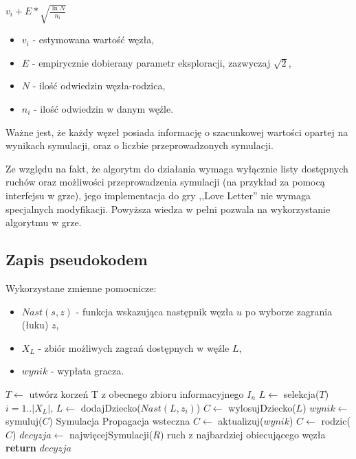 \begin{center}
	${v_i} + E*\sqrt{\frac{\ln{N}}{n_i}}$
\end{center}
\begin{itemize}
	\item $v_i$ - estymowana wartość węzła,
	\item $E$ - empirycznie dobierany parametr eksploracji, zazwyczaj $\sqrt{2}$,
	\item $N$ - ilość odwiedzin węzła-rodzica,
	\item $n_i$ - ilość odwiedzin w danym węźle.
\end{itemize}
Ważne jest, że każdy węzeł posiada informację o szacunkowej wartości opartej na wynikach symulacji, oraz o liczbie przeprowadzonych symulacji.

Ze względu na fakt, że algorytm do działania wymaga wyłącznie listy dostępnych ruchów oraz możliwości przeprowadzenia symulacji (na przykład za pomocą interfejsu w grze), jego implementacja do gry ,,Love Letter'' nie wymaga specjalnych modyfikacji. Powyższa wiedza w pełni pozwala na wykorzystanie algorytmu w grze.
\subsection{Zapis pseudokodem}
Wykorzystane zmienne pomocnicze:
\begin{itemize}
	\item $Nast(s, z)$ - funkcja wskazująca następnik węzła $u$ po wyborze zagrania (łuku) $z$,
	\item $X_L$ - zbiór możliwych zagrań dostępnych w węźle $L$,
	\item $wynik$ - wypłata gracza.
\end{itemize}
\begin{algorithmic}[1]
		\State $T \gets $ utwórz korzeń T z obecnego zbioru informacyjnego $I_n$
		\Repeat
			\State $L \gets $ selekcja($T$)
				 \Comment $i=1..|X_L|$, 
					\State $L \gets$ dodajDziecko($Nast(L, z_i)$)
				\EndFor
				\State $C \gets$ wylosujDziecko($L$)
				\State $wynik \gets$ symuluj($C$)	\Comment Symulacja
				\Repeat	\Comment Propagacja wsteczna
					\State $C \gets $ aktualizuj($wynik$)
					\State $C \gets $ rodzic($C$)
			\EndIf 
		\State $decyzja \gets$ najwięcejSymulacji($R$) \Comment ruch z najbardziej obiecującego węzła 
		\State \textbf{return} $decyzja$
	\EndFunction
\end{algorithmic}